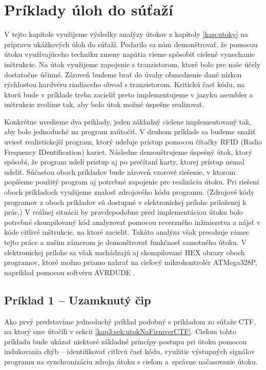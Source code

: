 \chapter{Príklady úloh do súťaží}
\label{kap:CTF}

V tejto kapitole využijeme výsledky analýzy útokov z kapitoly \ref{kap:utoky} na prípravu ukážkových úloh do súťaží. Podarilo sa nám demonštrovať, že pomocou útoku využívajúceho techniku zmeny napätia vieme spôsobiť cielené vynechanie inštrukcie. Na útok využijeme zapojenie s tranzistorom, ktoré bolo pre naše účely dostatočne účinné. Zároveň budeme brať do úvahy obmedzenie dané nízkou rýchlosťou hardvéru riadiaceho obvod s tranzistorom. Kritickú časť kódu, na ktorú bude v príklade treba zacieliť preto implementujeme v jazyku asembler a inštrukcie zvolíme tak, aby bolo útok možné úspešne realizovať.

Konkrétne uvedieme dva príklady, jeden základný cielene implementovaný tak, aby bolo jednoduché na program zaútočiť. V druhom príklade sa budeme snažiť uviesť realistickejší program, ktorý udeľuje prístup pomocou čítačky RFID (Radio Frequency IDentification) kariet. Následne demonštrujeme úspešný útok, ktorý spôsobí, že program udelí prístup aj po prečítaní karty, ktorej prístup nemal udeliť. Súčasťou oboch príkladov bude zároveň vzorové riešenie, v ktorom popíšeme použitý program aj potrebné zapojenie pre realizáciu útoku. Pri riešení oboch príkladoch využijeme znalosť zdrojového kódu programu. (Zdrojové kódy programov z oboch príkladov sú dostupné v elektronickej prílohe priloženej k prác.) V reálnej situácii by pravdepodobne pred implementáciou útoku bolo potrebné skompilovaný kód analyzovať pomocou reverzného inžinierstva a nájsť v kóde citlivé inštrukcie, na ktoré zacieliť. Takáto analýza však presahuje rámec tejto práce a našim zámerom je demonštrovať funkčnosť samotného útoku. V elektronickej prílohe sa však nachádzajú aj skompilované HEX obrazy oboch programov, ktoré možno priamo nahrať na cieľový mikrokontrolér ATMega328P, napríklad pomocou softvéru AVRDUDE \cite{avrdude}.

\section{Príklad 1 -- Uzamknutý čip} \label{kap4:sek:priklad1}
Ako prvý predstavíme jednoduchý príklad podobný s príkladom zo súťaže CTF, na ktorý sme útočili v sekcii \ref{kap3:sek:utokNaFirmverCTF}. Cieľom tohto príkladu bude ukázať niektoré základné princípy postupu pri útoku pomocou indukovania chýb -- identifikovať citlivú časť kódu, využitie výstupných signálov programu na synchronizáciu zdroja útoku s cieľom a~správne načasovanie útoku.


